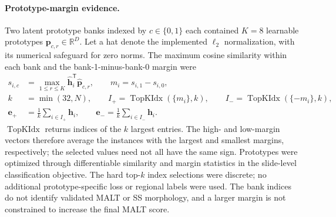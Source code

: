 \paragraph{Prototype-margin evidence.}
Two latent prototype banks indexed by $c\in\{0,1\}$ each contained
$K=8$ learnable prototypes
$\mathbf{p}_{c,r}\in\mathbb{R}^{D}$. Let a hat denote the implemented
$\ell_2$ normalization, with its numerical safeguard for zero norms.
The maximum cosine similarity within each bank and the bank-1-minus-bank-0 margin
were
\begin{subequations}\label{eq:prototype}
\begin{align}
 s_{i,c} &= \max_{1\leq r\leq K}
       \widehat{\mathbf{h}}_i^{\mathsf T}\widehat{\mathbf{p}}_{c,r},
       \qquad m_i=s_{i,1}-s_{i,0},\label{eq:margin}\\
 k &= \min(32,N),\qquad
 I_{+}=\operatorname{TopKIdx}(\{m_i\},k),\qquad
 I_{-}=\operatorname{TopKIdx}(\{-m_i\},k),\\
 \mathbf{e}_{+} &= \frac{1}{k}\sum_{i\in I_{+}}\mathbf{h}_i,
 \qquad \mathbf{e}_{-}=\frac{1}{k}\sum_{i\in I_{-}}\mathbf{h}_i.
\end{align}
\end{subequations}
$\operatorname{TopKIdx}$ returns indices of the $k$ largest entries. The high-
and low-margin vectors therefore average the instances with the largest and
smallest margins, respectively; the selected values need not all have the same
sign. Prototypes were optimized through differentiable similarity and margin
statistics in the slide-level classification objective. The hard top-$k$ index
selections were discrete; no additional prototype-specific loss or regional
labels were used. The bank indices do not identify validated MALT or SS
morphology, and a larger margin is not constrained to increase the final MALT score.

